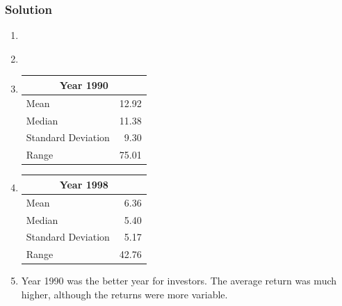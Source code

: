 \documentclass[a4paper,oneside]{book}
\begin{document}
\subsubsection*{Solution}

\begin{enumerate}

%
%
%

\item ~

\vspace{-4em}
\begin{center}
\end{center}

\item ~

\vspace{-4em}
\begin{center}
\end{center}

\item 
\begin{tabular}{lr}
\hline
\multicolumn{2}{c}{Year 1990} \\
\hline
Mean               & 12.92 \\
Median             & 11.38 \\
Standard Deviation &  9.30 \\
Range              & 75.01 \\
\hline
\end{tabular}


\item 
\begin{tabular}{lr}
\hline
\multicolumn{2}{c}{Year 1998} \\
\hline
Mean                   &   6.36 \\
Median                 &   5.40 \\
Standard Deviation     &   5.17 \\
Range                  &  42.76 \\
\hline
\end{tabular}


\item Year 1990 was the better year for investors. The average return
  was much higher, although the returns were more variable.
\end{enumerate}
\end{document}
